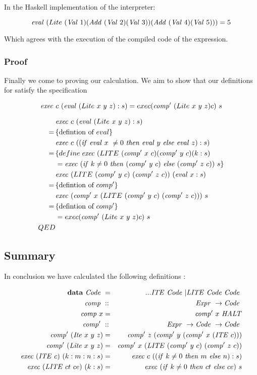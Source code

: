 \documentclass {article}
\begin{document}
In the Haskell implementation of the
interpreter:

\[ \mathit{eval\ }  (Lite\ (\mathit{Val\ } 1) (\mathit{Add\ } (\mathit{Val\ } 2) (\mathit{Val\ } 3)) (\mathit{Add\ } (\mathit{Val\ } 4) (\mathit{Val\ } 5)))  = 5\]


Which agrees with the execution of the 
compiled code of the expression.

\subsubsection{Proof}

Finally we come to proving our calculation.
We aim to show that our definitions for \lite
satisfy the specification

\[ \mathit{exec\ } c\ (\mathit{eval\ }  (Lite\ x\ y\ z):s) = exec (\mathit{comp'\ }  (Lite\ x\ y\ z) c)\ s  \]

\begin{align*}
&\Exec c\ (\evalf  (Lite\ x\ y\ z):s) \\
=\, & \{ \mbox{defintion of}\ eval \} \\
&\Exec c\ ((\ifff \evalf  x\ \not= 0\ \tthen \evalf  y\ \eelse \evalf  z) :s) \\
=\, & \{ define\: \Exec (LITE\ (\Compp  x\ c) (\Compp  y\ c) (k : s) \\
&= \Exec (\ifff k \not=0\ \tthen (\Compp  y\ c)\ \eelse (\Compp  z\ c))\ s \} \\
& \Exec (LITE\ (\Compp  y\ c)\ (\Compp  z\ c))\ (\evalf  x : s) \\
=\, & \{ \mbox{defintion of}\ comp' \} \\
& \Exec (\Compp  x\ (LITE\ (\Compp  y\ c)\ (\Compp  z\ c)))\ s \\
=\, & \{\mbox{defintion of}\ comp' \} \\
&= exec (\Compp  (Lite\ x\ y\ z) c)\ s \\
QED
\end{align*}

\subsection{Summary}

In conclusion we have calculated the following definitions
												\cite[page 11]{bandh}:

\begin{eqnarray*}
	\textbf{data}\ \Code &=& ...\ITE \Code | \LITE \Code \Code \\
	\Comp 				  &::& \Expr \rightarrow \Code \\
	\Comp x			  &=& \Compp  x\ \HALT \\
	\Compp				  &::& \Expr \rightarrow \Code \rightarrow \Code \\
	\Compp  (\Ite x\ y\ z) 
				&=& \Compp  z\ (\Compp  y\ (\Compp  x\ (\ITE c))) \\
	\Compp  (\Lite x\ y\ z) 
				&=& \Compp  x\ (\LITE (\Compp  y\ c)\ (\Compp  z\ c)) \\
	\Exec (\ITE c)\ (k:m:n:s) 
						&=& \Exec c\ ((\ifff k \not=0\ \tthen m\ \eelse n):s) \\
	\Exec (\LITE ct\ ce)\ (k:s) 
						&=& \Exec (\ifff k \not=0\ \tthen ct\ \eelse ce)\ s
\end{eqnarray*}
\end{document}
